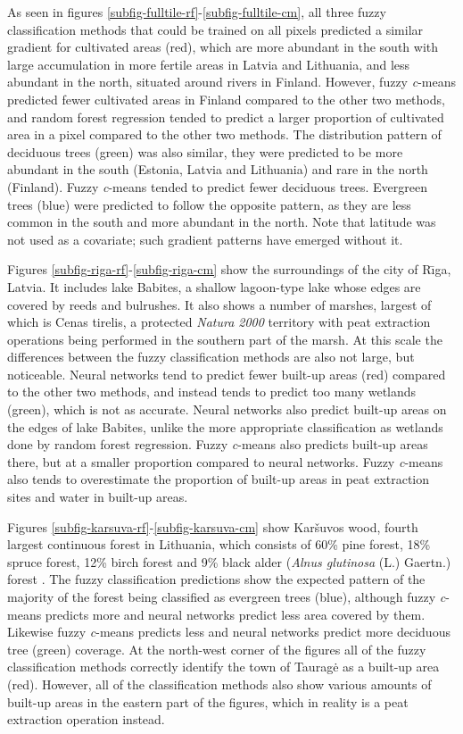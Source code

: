 \documentclass[a4paper,12pt]{scrbook}
\begin{document}
As seen in figures \ref{subfig-fulltile-rf}-\ref{subfig-fulltile-cm}, all three fuzzy classification methods that could be trained on all pixels predicted a similar gradient for cultivated areas (red), which are more abundant in the south with large accumulation in more fertile areas in Latvia and Lithuania, and less abundant in the north, situated around rivers in Finland. However, fuzzy \textit{c}-means predicted fewer cultivated areas in Finland compared to the other two methods, and random forest regression tended to predict a larger proportion of cultivated area in a pixel compared to the other two methods. The distribution pattern of deciduous trees (green) was also similar, they were predicted to be more abundant in the south (Estonia, Latvia and Lithuania) and rare in the north (Finland). Fuzzy \textit{c}-means tended to predict fewer deciduous trees. Evergreen trees (blue) were predicted to follow the opposite pattern, as they are less common in the south and more abundant in the north. Note that latitude was not used as a covariate; such gradient patterns have emerged without it.

Figures \ref{subfig-riga-rf}-\ref{subfig-riga-cm} show the surroundings of the city of R\={\i}ga, Latvia. It includes lake Babites, a shallow lagoon-type lake whose edges are covered by reeds and bulrushes. It also shows a number of marshes, largest of which is Cenas tirelis, a protected \textit{Natura 2000} territory with peat extraction operations being performed in the southern part of the marsh. At this scale the differences between the fuzzy classification methods are also not large, but noticeable. Neural networks tend to predict fewer built-up areas (red) compared to the other two methods, and instead tends to predict too many wetlands (green), which is not as accurate. Neural networks also predict built-up areas on the edges of lake Babites, unlike the more appropriate classification as wetlands done by random forest regression. Fuzzy \textit{c}-means also predicts built-up areas there, but at a smaller proportion compared to neural networks. Fuzzy \textit{c}-means also tends to overestimate the proportion of built-up areas in peat extraction sites and water in built-up areas.

Figures \ref{subfig-karsuva-rf}-\ref{subfig-karsuva-cm} show Kar\v{s}uvos wood, fourth largest continuous forest in Lithuania, which consists of 60\% pine forest, 18\% spruce forest, 12\% birch forest and 9\% black alder (\textit{Alnus glutinosa} (L.) Gaertn.) forest \citep{lietuviuenciklopedija2006}. The fuzzy classification predictions show the expected pattern of the majority of the forest being classified as evergreen trees (blue), although fuzzy \textit{c}-means predicts more and neural networks predict less area covered by them. Likewise fuzzy \textit{c}-means predicts less and neural networks predict more deciduous tree (green) coverage. At the north-west corner of the figures all of the fuzzy classification methods correctly identify the town of Taurag\.{e} as a built-up area (red). However, all of the classification methods also show various amounts of built-up areas in the eastern part of the figures, which in reality is a peat extraction operation instead.
\end{document}
